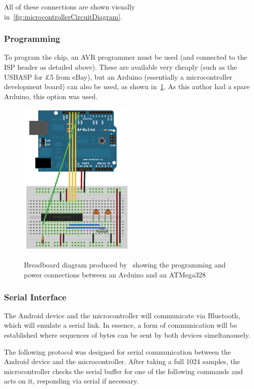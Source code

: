 All of these connections are shown visually
in~\cref{fig:microcontrollerCircuitDiagram}.

\subsubsection{Programming}

To program the chip, an AVR programmer must be used (and connected to the ISP
header as detailed above). These are available very cheaply (such as the USBASP
for \pounds 5 from eBay), but an Arduino (essentially a microcontroller
development board) can also be used, as shown in~\cref{fig:arduino_programmer}.
As this author had a spare Arduino, this option was used.

\begin{figure}
  \centering
  \includegraphics[width=0.5\textwidth]{img/microcontroller/arduino_programmer.png}
  \label{fig:arduino_programmer}
  \caption[Arduino as a Programmer]{Breadboard diagram produced by~\textcite{ArduinoProgrammer} showing
  the programming and power connections between an Arduino and an ATMega328}
\end{figure}


\subsubsection{Serial Interface}

The Android device and the microcontroller will communicate via Bluetooth, which
will emulate a serial link. In essence, a form of communication will be
established where sequences of bytes can be sent by both devices simeltanousely.

The following protocol was designed for serial communication between the Android
device and the microcontroller. After taking a full 1024 samples, the
microcontroller checks the serial buffer for one of the following commands and
acts on it, responding via serial if necessary.

